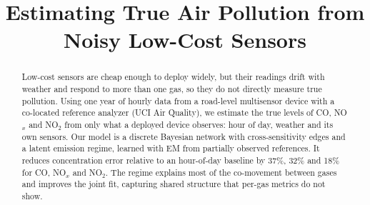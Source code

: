 \documentclass[11pt]{article}
\title{Estimating True Air Pollution from Noisy Low-Cost Sensors}
\date{}
\begin{document}
\maketitle

\begin{abstract}
  Low-cost sensors are cheap enough to deploy widely, but their
  readings drift with weather and respond to more than one gas, so they do not
  directly measure true pollution. Using one year of hourly data from a
  road-level multisensor device with a co-located reference analyzer (UCI Air
  Quality), we estimate the true levels of CO, NO$_x$ and NO$_2$ from only what
  a deployed device observes: hour of day, weather and its own sensors. Our
  model is a discrete Bayesian network with cross-sensitivity edges and a
  latent emission regime, learned with EM from partially observed references.
  It reduces concentration error relative to an hour-of-day baseline by
  37\%, 32\% and 18\% for CO, NO$_x$ and NO$_2$. The regime
  explains most of the co-movement between gases and improves the joint fit, 
  capturing shared structure that per-gas metrics do not show. 
\end{abstract}












\appendix

\end{document}
